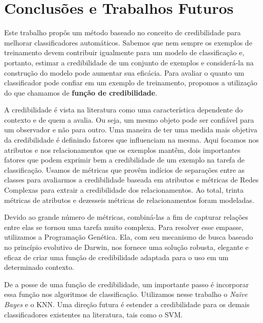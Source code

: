 \chapter{Conclusões e Trabalhos Futuros}
\label{cap::conclusoes}

Este trabalho propôs um método baseado no conceito de credibilidade para melhorar classificadores automáticos.
Sabemos que nem sempre os exemplos de treinamento devem contribuir igualmente para um modelo de classificação e, portanto, estimar a credibilidade de um conjunto de exemplos e considerá-la na construção do modelo pode aumentar sua eficácia. 
Para avaliar o quanto um classificador pode confiar em um exemplo de treinamento, propomos a utilização do que chamamos de \textbf{função de credibilidade}.

A credibilidade é vista na literatura como uma característica dependente do contexto e de quem a avalia. Ou seja, um mesmo objeto pode ser confiável para um observador e não para outro.
Uma maneira de ter uma medida mais objetiva da credibilidade é definindo fatores que influenciam na mesma.
Aqui focamos nos atributos e nos relacionamentos que os exemplos mantêm, dois importantes fatores que podem exprimir bem a credibilidade de um exemplo na tarefa de classificação.
Usamos de métricas que provêm indícios de separações entre as classes para avaliarmos a credibilidade baseada em atributos e métricas de Redes Complexas para extrair a credibilidade dos relacionamentos. Ao total, trinta métricas de atributos e dezesseis métricas de relacionamentos foram modeladas.

Devido ao grande número de métricas, combiná-las a fim de capturar relações entre elas se tornou uma tarefa muito complexa.
Para resolver esse empasse, utilizamos a Programação Genética. Ela, com seu mecanismo de busca baseado no princípio evolutivo de Darwin, nos fornece uma solução robusta, elegante e eficaz de criar uma função de credibilidade adaptada para o uso em um determinado contexto.

De a posse de uma função de credibilidade, um importante passo é incorporar essa função nos algoritmos de classificação. Utilizamos nesse trabalho o \textit{Naïve Bayes} e o \textsc{KNN}. Uma direção futura é estender a credibilidade para os demais classificadores existentes na literatura, tais como o \textsc{SVM}.

